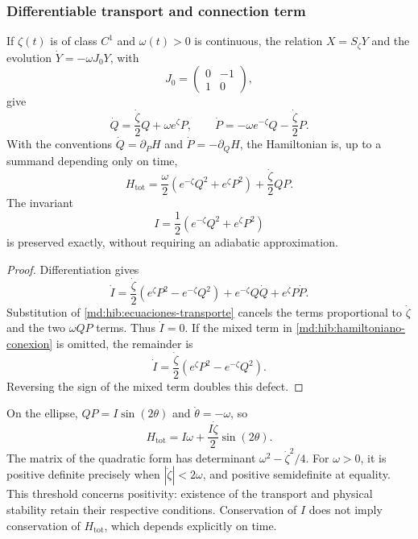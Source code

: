 \subsubsection{Differentiable transport and connection term}
\label{md:hib:conexion}

If $\zeta(t)$ is of class $C^1$ and $\omega(t)>0$ is continuous, the
relation $X=S_\zeta Y$ and the evolution $\dot Y=-\omega J_0Y$, with
\begin{equation}
 J_0=\begin{pmatrix}0&-1\\1&0\end{pmatrix},
 \label{md:hib:j-canonico}
\end{equation}
give
\begin{equation}
 \dot Q=\frac{\dot\zeta}{2}Q+\omega e^\zeta P,\qquad
 \dot P=-\omega e^{-\zeta}Q-\frac{\dot\zeta}{2}P.
 \label{md:hib:ecuaciones-transporte}
\end{equation}
With the conventions $\dot Q=\partial_PH$ and
$\dot P=-\partial_QH$, the Hamiltonian is, up to a summand depending
only on time,
\begin{equation}
 \boxed{H_{\mathrm{tot}}=
 \frac{\omega}{2}\left(e^{-\zeta}Q^2+e^\zeta P^2\right)
 +\frac{\dot\zeta}{2}QP.}
 \label{md:hib:hamiltoniano-conexion}
\end{equation}
The invariant
\begin{equation}
 I=\frac12\left(e^{-\zeta}Q^2+e^\zeta P^2\right)
 \label{md:hib:invariante}
\end{equation}
is preserved exactly, without requiring an adiabatic approximation.
\begin{proof}
Differentiation gives
\[
 \dot I=\frac{\dot\zeta}{2}
 \left(e^\zeta P^2-e^{-\zeta}Q^2\right)
 +e^{-\zeta}Q\dot Q+e^\zeta P\dot P.
\]
Substitution of \eqref{md:hib:ecuaciones-transporte} cancels the terms
proportional to $\dot\zeta$ and the two $\omega QP$ terms.
Thus $\dot I=0$. If the mixed term in
\eqref{md:hib:hamiltoniano-conexion} is omitted, the remainder is
\begin{equation}
 \dot I=\frac{\dot\zeta}{2}
 \left(e^\zeta P^2-e^{-\zeta}Q^2\right).
 \label{md:hib:defecto-sin-conexion}
\end{equation}
Reversing the sign of the mixed term doubles this defect.
\end{proof}
On the ellipse, $QP=I\sin(2\theta)$ and $\dot\theta=-\omega$, so
\begin{equation}
 H_{\mathrm{tot}}=I\omega+\frac{I\dot\zeta}{2}\sin(2\theta).
 \label{md:hib:hamiltoniano-elipse}
\end{equation}
The matrix of the quadratic form has determinant
$\omega^2-\dot\zeta^2/4$. For $\omega>0$, it is positive definite
precisely when $|\dot\zeta|<2\omega$, and positive semidefinite at equality.
This threshold concerns positivity: existence of the transport and
physical stability retain their respective conditions. Conservation of
$I$ does not imply conservation of $H_{\mathrm{tot}}$, which depends
explicitly on time.

